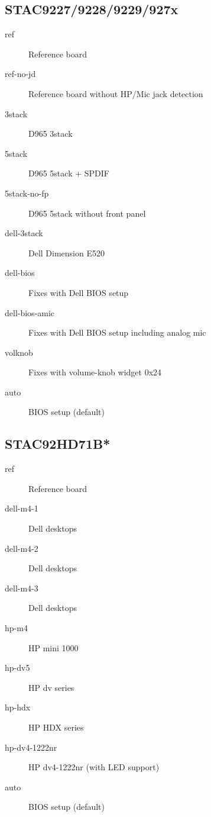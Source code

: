 \documentclass[a4paper,8pt,english]{sphinxmanual}
\begin{document}
\subsection{STAC9227/9228/9229/927x}
\label{sound/hd-audio/models:stac9227-9228-9229-927x}\begin{description}
\item[{ref}] \leavevmode
Reference board

\item[{ref-no-jd}] \leavevmode
Reference board without HP/Mic jack detection

\item[{3stack}] \leavevmode
D965 3stack

\item[{5stack}] \leavevmode
D965 5stack + SPDIF

\item[{5stack-no-fp}] \leavevmode
D965 5stack without front panel

\item[{dell-3stack}] \leavevmode
Dell Dimension E520

\item[{dell-bios}] \leavevmode
Fixes with Dell BIOS setup

\item[{dell-bios-amic}] \leavevmode
Fixes with Dell BIOS setup including analog mic

\item[{volknob}] \leavevmode
Fixes with volume-knob widget 0x24

\item[{auto}] \leavevmode
BIOS setup (default)

\end{description}


\subsection{STAC92HD71B*}
\label{sound/hd-audio/models:stac92hd71b}\begin{description}
\item[{ref}] \leavevmode
Reference board

\item[{dell-m4-1}] \leavevmode
Dell desktops

\item[{dell-m4-2}] \leavevmode
Dell desktops

\item[{dell-m4-3}] \leavevmode
Dell desktops

\item[{hp-m4}] \leavevmode
HP mini 1000

\item[{hp-dv5}] \leavevmode
HP dv series

\item[{hp-hdx}] \leavevmode
HP HDX series

\item[{hp-dv4-1222nr}] \leavevmode
HP dv4-1222nr (with LED support)

\item[{auto}] \leavevmode
BIOS setup (default)

\end{description}
\end{document}
